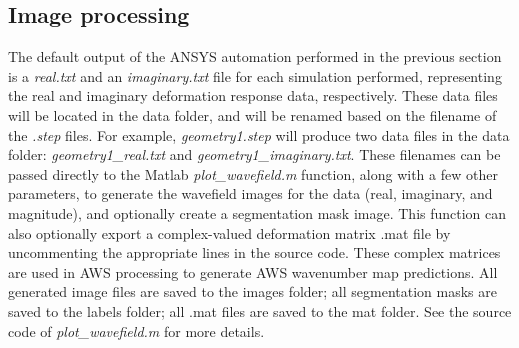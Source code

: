 \documentclass[11pt,letterpaper]{article}
\begin{document}
		\subsection{Image processing}
		The default output of the ANSYS automation performed in the previous section is a \textit{real.txt} and an \textit{imaginary.txt} file for each simulation performed, representing the real and imaginary deformation response data, respectively. These data files will be located in the data folder, and will be renamed based on the filename of the \textit{.step} files. For example, \textit{geometry1.step} will produce two data files in the data folder: \textit{geometry1\_real.txt} and \textit{geometry1\_imaginary.txt}. These filenames can be passed directly to the Matlab \textit{plot\_wavefield.m} function, along with a few other parameters, to generate the wavefield images for the data (real, imaginary, and magnitude), and optionally create a segmentation mask image. This function can also optionally export a complex-valued deformation matrix .mat file by uncommenting the appropriate lines in the source code. These complex matrices are used in AWS processing to generate AWS wavenumber map predictions. All generated image files are saved to the images folder; all segmentation masks are saved to the labels folder; all .mat files are saved to the mat folder. See the source code of \textit{plot\_wavefield.m} for more details. \bigskip
		
\end{document}
